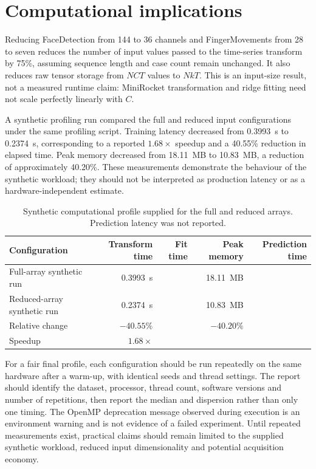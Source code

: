 \section{Computational implications}
Reducing FaceDetection from 144 to 36 channels and FingerMovements from 28 to seven reduces the number of input values passed to the time-series transform by 75\%, assuming sequence length and case count remain unchanged. It also reduces raw tensor storage from $NCT$ values to $NkT$. This is an input-size result, not a measured runtime claim: MiniRocket transformation and ridge fitting need not scale perfectly linearly with $C$.

A synthetic profiling run compared the full and reduced input configurations under the same profiling script. Training latency decreased from 0.3993~s to 0.2374~s, corresponding to a reported $1.68\times$ speedup and a 40.55\% reduction in elapsed time. Peak memory decreased from 18.11~MB to 10.83~MB, a reduction of approximately 40.20\%. These measurements demonstrate the behaviour of the synthetic workload; they should not be interpreted as production latency or as a hardware-independent estimate.

\begin{table}[htbp]
\centering
\caption{Synthetic computational profile supplied for the full and reduced arrays. Prediction latency was not reported.}
\label{tab:runtime}
\begin{tabularx}{\textwidth}{@{}Yrrrr@{}}
\toprule
Configuration & Transform time & Fit time & Peak memory & Prediction time\\
\midrule
Full-array synthetic run & 0.3993~s & & 18.11~MB & \\
Reduced-array synthetic run & 0.2374~s & & 10.83~MB & \\
Relative change & $-40.55\%$ & & $-40.20\%$ & \\
Speedup & $1.68\times$ & & & \\
\bottomrule
\end{tabularx}
\end{table}

For a fair final profile, each configuration should be run repeatedly on the same hardware after a warm-up, with identical seeds and thread settings. The report should identify the dataset, processor, thread count, software versions and number of repetitions, then report the median and dispersion rather than only one timing. The OpenMP deprecation message observed during execution is an environment warning and is not evidence of a failed experiment. Until repeated measurements exist, practical claims should remain limited to the supplied synthetic workload, reduced input dimensionality and potential acquisition economy.

